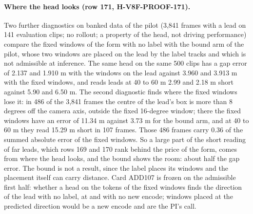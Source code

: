 \paragraph{Where the head looks (row 171, H-V8F-PROOF-171).} Two further  diagnostics on banked data of the pilot (3,841 frames with a lead on 141 evaluation clips; no rollout; a property of the head, not driving performance) compare the fixed windows of the form with no label with the bound arm of the pilot, whose two windows are placed on the lead by the label tracks and which is not admissible at inference. The same head on the same 500 clips has a gap error of 2.137 and 1.910 m with the windows on the lead against 3.960 and 3.913 m with the fixed windows, and reads leads at 40 to 60 m 2.99 and 2.18 m short against 5.90 and 6.50 m. The second diagnostic finds where the fixed windows lose it: in 486 of the 3,841 frames the centre of the lead's box is more than 8 degrees off the camera axis, outside the fixed 16-degree window; there the fixed windows have an error of 11.34 m against 3.73 m for the bound arm, and at 40 to 60 m they read 15.29 m short in 107 frames. Those 486 frames carry 0.36 of the summed absolute error of the fixed windows. So a large part of the short reading of far leads, which rows 169 and 170 rank behind the price of the form, comes from where the head looks, and the bound shows the room: about half the gap error. The bound is not a result, since the label places its windows and the placement itself can carry distance. Card ADD107 is frozen on the admissible first half: whether a head on the tokens of the fixed windows finds the direction of the lead with no label, at  and with no new encode; windows placed at the predicted direction would be a new encode and are the PI's call.

